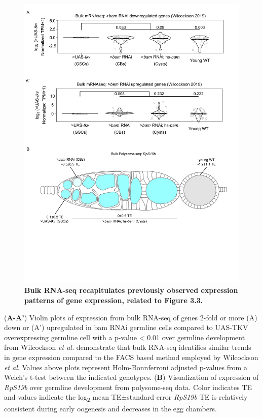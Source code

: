 \documentclass[12pt,oneside]{reedthesis}
\begin{document}
\begin{figure}

{\centering \includegraphics[width=1\linewidth]{./figure/Oo_site/Supplemental_Figure2} 

}

\caption[\textbf{Bulk RNA-seq recapitulates previously observed expression patterns of gene expression, related to Figure 3.3.}]{\textbf{Bulk RNA-seq recapitulates previously observed expression patterns of gene expression, related to Figure 3.3.}}\label{fig:oosite-fig-4}
\end{figure}

\setlength\parindent{0pt}(\textbf{A-A'}) Violin plots of expression from bulk RNA-seq of genes 2-fold or more (A) down or (A') upregulated in bam RNAi germline cells compared to UAS-TKV overexpressing germline cell with a p-value \textless{} 0.01 over germline development from Wilcockson \emph{et al.} demonstrate that bulk RNA-seq identifies similar trends in gene expression compared to the FACS based method employed by Wilcockson \emph{et al}. Values above plots represent Holm-Bonnferroni adjusted p-values from a Welch's t-test between the indicated genotypes. (\textbf{B}) Visualization of expression of \emph{RpS19b} over germline development from polysome-seq data. Color indicates TE and values indicate the log\textsubscript{2} mean TE±standard error \emph{RpS19b} TE is relatively consistent during early oogenesis and decreases in the egg chambers.
\end{document}
